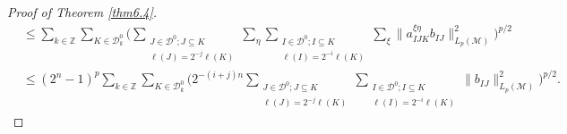 \documentclass[oneside,english,a4wide]{amsart}
\numberwithin{equation}{section}
\numberwithin{figure}{section}
\theoremstyle{plain}
\theoremstyle{plain}
\theoremstyle{definition}
\theoremstyle{plain}
\theoremstyle{remark}
\theoremstyle{definition}
\theoremstyle{remark}
\theoremstyle{definition}
\newcommand{\8}{\infty}
\begin{document}
\begin{proof}[Proof of Theorem \ref{thm6.4}]
\begin{equation}
\begin{aligned}
		&\le\sum_{k\in\mathbb{Z}}\sum_{K\in\mathcal{D}^0_k}\biggl(\sum_{\substack{J\in\mathcal{D}^0;J\subseteq K\\ \ell(J)=2^{-j}\ell(K)}}\sum_{\eta}\sum_{\substack{I\in\mathcal{D}^0;I\subseteq K \\ \ell(I)=2^{-i}\ell(K)}}\sum_{ \xi}\Big\|a_{IJK}^{\xi\eta} b_{IJ}\Big\|_{L_{p}(\mathcal{M})}^2\biggr)^{p/2}\\
		&\le(2^n-1)^p\sum_{k\in\mathbb{Z}}\sum_{K\in\mathcal{D}^0_k}\biggl(2^{-(i+j)n}\sum_{\substack{J\in\mathcal{D}^0;J\subseteq K\\ \ell(J)=2^{-j}\ell(K)}}\sum_{\substack{I\in\mathcal{D}^0;I\subseteq K\\ \ell(I)=2^{-i}\ell(K)}}\|b_{IJ}\|_{L_p(\mathcal{M})}^2\biggr)^{p/2}.
	\end{aligned}
\end{equation}

\end{proof}
\end{document}
